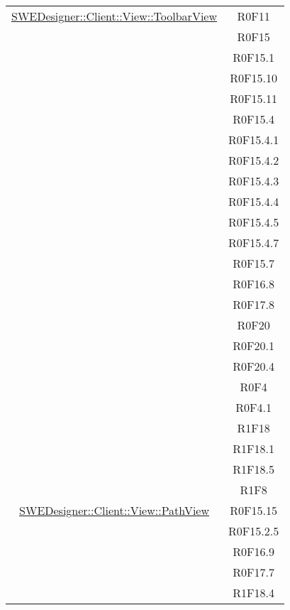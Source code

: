 \documentclass[../DefinizioneDiProdotto.tex]{subfiles}
\begin{document}
\begin{longtable}{|c|c|}
				\hyperlink{SWEDesigner::Client::View::ToolbarView}{SWEDesigner::Client::View::ToolbarView}
				& R0F11\\
				& R0F15\\
				& R0F15.1\\
				& R0F15.10\\
				& R0F15.11\\
				& R0F15.4\\
				& R0F15.4.1\\
				& R0F15.4.2\\
				& R0F15.4.3\\
				& R0F15.4.4\\
				& R0F15.4.5\\
				& R0F15.4.7\\
				& R0F15.7\\
				& R0F16.8\\
				& R0F17.8\\
				& R0F20\\
				& R0F20.1\\
				& R0F20.4\\
				& R0F4\\
				& R0F4.1\\
				& R1F18\\
				& R1F18.1\\
				& R1F18.5\\
				& R1F8\\
				\hline

				\hyperlink{SWEDesigner::Client::View::PathView}{SWEDesigner::Client::View::PathView}
				& R0F15.15\\
				& R0F15.2.5\\
				& R0F16.9\\
				& R0F17.7\\
				& R1F18.4\\
				\hline


\end{longtable}
\end{document}

